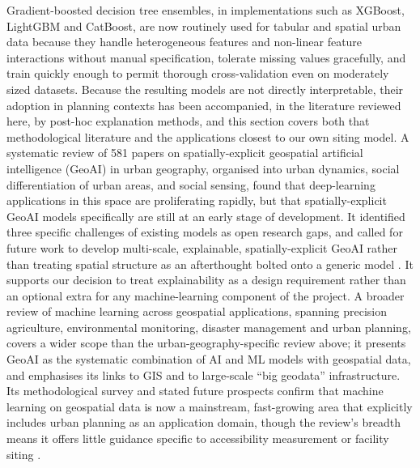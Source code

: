 \documentclass[journal]{IEEEtran}
\begin{document}
Gradient-boosted decision tree ensembles, in implementations such as XGBoost, LightGBM and CatBoost, are now routinely used for tabular and spatial urban data because they handle heterogeneous features and non-linear feature interactions without manual specification, tolerate missing values gracefully, and train quickly enough to permit thorough cross-validation even on moderately sized datasets. Because the resulting models are not directly interpretable, their adoption in planning contexts has been accompanied, in the literature reviewed here, by post-hoc explanation methods, and this section covers both that methodological literature and the applications closest to our own siting model. A systematic review of 581 papers on spatially-explicit geospatial artificial intelligence (GeoAI) in urban geography, organised into urban dynamics, social differentiation of urban areas, and social sensing, found that deep-learning applications in this space are proliferating rapidly, but that spatially-explicit GeoAI models specifically are still at an early stage of development. It identified three specific challenges of existing models as open research gaps, and called for future work to develop multi-scale, explainable, spatially-explicit GeoAI rather than treating spatial structure as an afterthought bolted onto a generic model \cite{liu2022}. It supports our decision to treat explainability as a design requirement rather than an optional extra for any machine-learning component of the project. A broader review of machine learning across geospatial applications, spanning precision agriculture, environmental monitoring, disaster management and urban planning, covers a wider scope than the urban-geography-specific review above; it presents GeoAI as the systematic combination of AI and ML models with geospatial data, and emphasises its links to GIS and to large-scale ``big geodata'' infrastructure. Its methodological survey and stated future prospects confirm that machine learning on geospatial data is now a mainstream, fast-growing area that explicitly includes urban planning as an application domain, though the review's breadth means it offers little guidance specific to accessibility measurement or facility siting \cite{boutayeb2025}.
\end{document}
